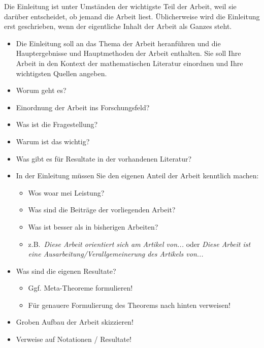 \documentclass[a4paper,11pt,bibliography=totoc,listof=totoc,headinclude=true,cleardoublepage=empty,oneside]{scrbook}
\begin{document}
{\color{change}

\noindent
Die Einleitung ist unter Umständen der wichtigste Teil der Arbeit, weil sie darüber entscheidet, ob jemand die Arbeit liest. Üblicherweise wird die Einleitung erst geschrieben, wenn der eigentliche Inhalt der Arbeit als Ganzes steht.

\begin{itemize}

\item Die Einleitung soll an das Thema der Arbeit heranführen und die Hauptergebnisse und Hauptmethoden der Arbeit enthalten. Sie soll Ihre Arbeit in den Kontext der mathematischen Literatur einordnen und Ihre wichtigsten Quellen angeben.

\item Worum geht es?
\item Einordnung der Arbeit ins Forschungsfeld?
\item Was ist die Fragestellung?
\item Warum ist das wichtig?
\item Was gibt es für Resultate in der vorhandenen Literatur?

\item In der Einleitung müssen Sie den eigenen Anteil der Arbeit kenntlich machen:
\begin{itemize}
\item Wos woar mei Leistung?
\item Was sind die Beiträge der vorliegenden Arbeit?
\item Was ist besser als in bisherigen Arbeiten?
\item z.B.\ \emph{Diese Arbeit orientiert sich am Artikel von...} oder \emph{Diese Arbeit
ist eine Ausarbeitung/Verallgemeinerung des Artikels von...}
\end{itemize}

\item Was sind die eigenen Resultate?
\begin{itemize}
\item Ggf. Meta-Theoreme formulieren!
\item Für genauere Formulierung des Theorems nach hinten verweisen!
\end{itemize}

\item Groben Aufbau der Arbeit skizzieren!
\item Verweise auf Notationen / Resultate!
\end{itemize}
}

\end{document}
